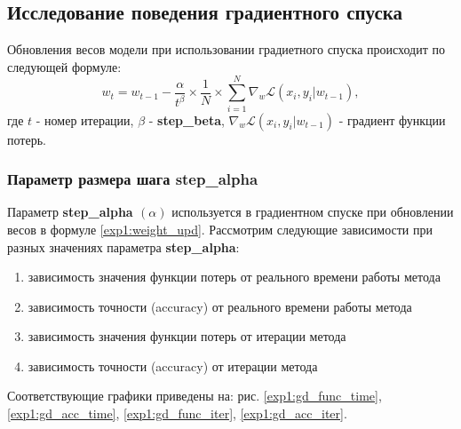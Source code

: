\documentclass[a4paper, 11pt]{article}
\begin{document}
        \subsection{Исследование поведения градиентного спуска}
            Обновления весов модели при использовании градиетного спуска происходит по следующей формуле:
            \begin{equation}\label{exp1:weight_upd}
            w_t = w_{t-1} - \frac{\alpha}{t^\beta} \times \frac{1}{N} \times \sum_{i=1}^{N}\nabla_{w}\mathcal{L}(x_i, y_i|w_{t-1}),
            \end{equation}
            где $t$ - номер итерации, $\beta$ - \textbf{step\_beta}, $\nabla_{w}\mathcal{L}(x_i, y_i|w_{t-1})$ - градиент функции потерь.
            \subsubsection{Параметр размера шага \textbf{step\_alpha}}
                Параметр \textbf{step\_alpha $(\alpha)$} используется в градиентном спуске при обновлении весов в формуле \ref{exp1:weight_upd}.
                Рассмотрим следующие зависимости при разных значениях параметра \textbf{step\_alpha}:
                    \begin{enumerate}\label{exp:dependencies}
                        \item зависимость значения функции потерь от реального времени работы метода
                        \item зависимость точности (accuracy) от реального времени работы метода
                        \item зависимость значения функции потерь от итерации метода
                        \item зависимость точности (accuracy) от итерации метода
                     \end{enumerate}
                 Соответствующие графики приведены на: рис. \ref{exp1:gd_func_time}, \ref{exp1:gd_acc_time}, \ref{exp1:gd_func_iter}, \ref{exp1:gd_acc_iter}.
   
\end{document}
